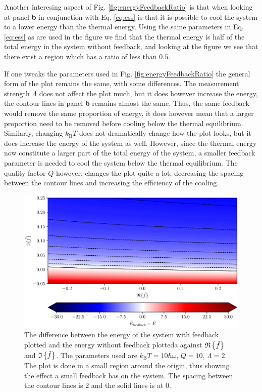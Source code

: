Another interesing aspect of Fig. \ref{fig:energyFeedbackRatio} is that when looking at panel \textbf{b} in conjunction with Eq. \eqref{eq:ess} is that it is possible to cool the system to a lower energy than the thermal energy. Using the same parameters in Eq. \eqref{eq:ess} as are used in the figure we find that the thermal energy is half of the total energy in the system without feedback, and looking at the figure we see that there exist a region which has a ratio of less than $0.5$.

If one tweaks the parameters used in Fig. \ref{fig:energyFeedbackRatio} the general form of the plot remains the same, with some differences. The measurement strength $\Lambda$ does not affect the plot much, but it does however increase the energy, the contour lines in panel \textbf{b} remains almost the same. Thus, the same feedback would remove the same proportion of energy, it does however mean that a larger proportion need to be removed before cooling below the thermal equilibrium. Similarly, changing $k_\text{B}T$ does not dramatically change how the plot looks, but it does increase the energy of the system as well. However, since the thermal energy now constitute a larger part of the total energy of the system, a smaller feedback parameter is needed to cool the system below the thermal equilibrium. The quality factor $Q$ however, changes the plot quite a lot, decreasing the spacing between the contour lines and increasing the efficiency of the cooling.

\begin{figure}[t]
    \centering
    \includegraphics[width=\textwidth]{figures/energyFeedbackDifference.pdf}
    \caption{\small The difference between the energy of the system with feedback plotted and the energy without feedback plotteda against $\mathfrak{R}\left\{\tilde{f}\right\}$ and $\mathfrak{I}\left\{\tilde{f}\right\}$. The parameters used are $k_\text{B}T = 10 \hbar\omega$, $Q = 10$, $\Lambda = 2$. The plot is done in a small region around the origin, thus showing the effect a small feedback has on the system. The spacing between the contour lines is $2$ and the solid lines is at $0$.}
    \label{fig:energyFeedbackDifference}
\end{figure}

